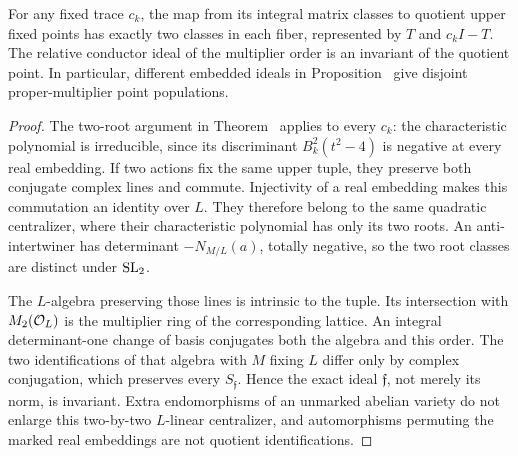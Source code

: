 \begin{lemma}
\label{lem:packetpointfibers}
For any fixed trace $c_k$, the map from its integral matrix classes to
quotient upper fixed points has exactly two classes in each fiber,
represented by $T$ and $c_kI-T$.  The relative conductor ideal of the
multiplier order is an invariant of the quotient point.  In particular,
different embedded ideals in Proposition~
give disjoint proper-multiplier point populations.
\end{lemma}
\begin{proof}
The two-root argument in Theorem~ applies to every
$c_k$: the characteristic polynomial is irreducible, since its
discriminant $B_k^2(t^2-4)$ is negative at every real embedding.
If two actions fix the same upper tuple, they preserve both conjugate
complex lines and commute.  Injectivity of a real embedding makes this
commutation an identity over $L$.  They therefore belong to the same
quadratic centralizer, where their characteristic polynomial has only
its two roots.  An anti-intertwiner has determinant $-N_{M/L}(a)$,
totally negative, so the two root classes are distinct under $\operatorname{SL}_2$.

The $L$-algebra preserving those lines is intrinsic to the tuple.
Its intersection with $M_2(\mathcal O_L)$ is the multiplier ring of the
corresponding lattice.  An integral determinant-one change of basis
conjugates both the algebra and this order.  The two identifications of
that algebra with $M$ fixing $L$ differ only by complex conjugation,
which preserves every $S_{\mathfrak f}$.  Hence the exact ideal
$\mathfrak f$, not merely its norm, is invariant.  Extra endomorphisms
of an unmarked abelian variety do not enlarge this two-by-two
$L$-linear centralizer, and automorphisms permuting the marked real
embeddings are not quotient identifications.
\end{proof}

